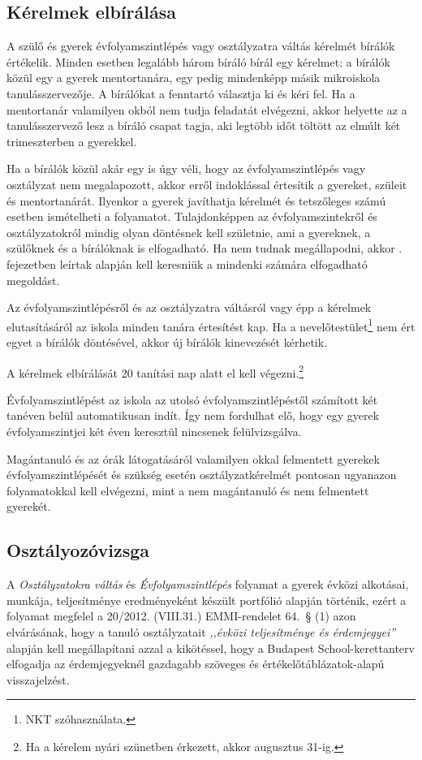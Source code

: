 
\subsection{Kérelmek elbírálása}

A szülő és gyerek évfolyamszintlépés vagy osztályzatra váltás kérelmét bírálók értékelik. Minden esetben legalább három bíráló bírál egy kérelmet: a bírálók közül egy a gyerek mentortanára, egy pedig mindenképp másik mikroiskola tanulásszervezője. A bírálókat a fenntartó választja ki és kéri fel. Ha a mentortanár valamilyen okból nem tudja feladatát elvégezni, akkor helyette az a tanulásszervező lesz a bíráló csapat tagja, aki legtöbb időt töltött az elmúlt két trimeszterben a gyerekkel.

Ha a bírálók közül akár egy is úgy véli, hogy az évfolyamszintlépés vagy osztályzat nem megalapozott, akkor erről indoklással értesítik a gyereket, szüleit és mentortanárát. Ilyenkor a gyerek javíthatja kérelmét és tetszőleges számú esetben ismételheti a folyamatot. Tulajdonképpen az évfolyamszintekről és osztályzatokról mindig olyan döntésnek kell születnie, ami a gyereknek, a szülőknek és a bírálóknak is elfogadható. Ha nem tudnak megállapodni, akkor . fejezetben leírtak alapján kell keresniük a mindenki számára elfogadható megoldást.

Az évfolyamszintlépésről és az osztályzatra váltásról vagy épp a kérelmek elutasításáról az iskola minden tanára értesítést kap. Ha a nevelőtestület\footnote{NKT szóhasználata.} nem ért egyet a bírálók döntésével, akkor új bírálók kinevezését kérhetik.

A kérelmek elbírálását 20 tanítási nap alatt el kell végezni.\footnote{Ha a kérelem nyári szünetben érkezett, akkor augusztus 31-ig.}

Évfolyamszintlépést az iskola az utolsó évfolyamszintlépéstől számított két tanéven belül automatikusan indít. Így nem fordulhat elő, hogy egy gyerek évfolyamszintjei két éven keresztül nincsenek felülvizsgálva.

Magántanuló és az órák látogatásáról valamilyen okkal felmentett gyerekek évfolyamszintlépését és szükség esetén osztályzatkérelmét pontosan ugyanazon folyamatokkal kell elvégezni, mint a nem magántanuló és nem felmentett gyerekét.

\subsection{Osztályozóvizsga}
A \emph{Osztályzatokra váltás} és \emph{Évfolyamszintlépés} folyamat a gyerek évközi alkotásai, munkája, teljesítménye eredményeként készült portfólió alapján történik, ezért a folyamat megfelel a 20/2012. (VIII.31.) EMMI-rendelet 64.~§ (1) azon elvárásának, hogy a tanuló osztályzatait \emph{,,évközi teljesítménye és érdemjegyei''} alapján kell megállapítani azzal a kikötéssel, hogy a Budapest School-kerettanterv elfogadja az érdemjegyeknél gazdagabb szöveges és értékelőtáblázatok-alapú visszajelzést.

